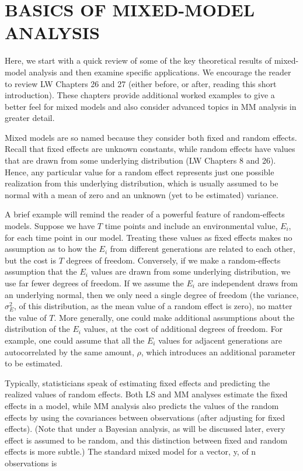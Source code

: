 \documentclass{article}
\begin{document}
\section{BASICS OF MIXED-MODEL ANALYSIS}
Here, we start with a quick review of some of the key theoretical results of mixed-model analysis and then examine specific applications. We encourage the reader to review LW Chapters 26 and 27 (either before, or after, reading this short introduction). These chapters provide additional worked examples to give a better feel for mixed models and also consider advanced topics in MM analysis in greater detail.

Mixed models are so named because they consider both fixed and random effects. Recall that fixed effects are unknown constants, while random effects have values that are drawn from some underlying distribution (LW Chapters 8 and 26). Hence, any particular value for a random effect represents just one possible realization from this underlying distribution, which is usually assumed to be normal with a mean of zero and an unknown (yet to be estimated) variance.

A brief example will remind the reader of a powerful feature of random-effects models. Suppose we have  $ T $ time points and include an environmental value,  $ E_i $, for each time point in our model. Treating these values as fixed effects makes no assumption as to how the  $ E_i $ from different generations are related to each other, but the cost is  $ T $ degrees of freedom. Conversely, if we make a random-effects assumption that the  $ E_i $ values are drawn from some underlying distribution, we use far fewer degrees of freedom. If we assume the  $ E_i $ are independent draws from an underlying normal, then we only need a single degree of freedom (the variance,  $ \sigma_E^2 $, of this distribution, as the mean value of a random effect is zero), no matter the value of  $ T $. More generally, one could make additional assumptions about the distribution of the  $ E_i $ values, at the cost of additional degrees of freedom. For example, one could assume that all the  $ E_i $ values for adjacent generations are autocorrelated by the same amount,  $ \rho $, which introduces an additional parameter to be estimated.

Typically, statisticians speak of estimating fixed effects and predicting the realized values of random effects. Both LS and MM analyses estimate the fixed effects in a model, while MM analysis also predicts the values of the random effects by using the covariances between observations (after adjusting for fixed effects). (Note that under a Bayesian analysis, as will be discussed later, every effect is assumed to be random, and this distinction between fixed and random effects is more subtle.) The standard mixed model for a vector, y, of n observations is
\end{document}
